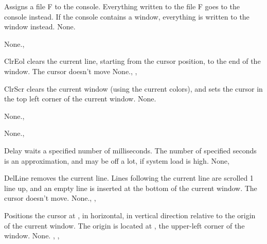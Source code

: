 {
Assigns a file F to the console. Everything written to the file F goes to
the console instead. If the console contains a window, everything is written
to the window instead.
}
{None.}{}

 \html{}

{None.}{, }

{ ClrEol clears the current line, starting from the cursor position, to the
end of the window. The cursor doesn't move}
{None.}{, , }

 \html{}

{ ClrScr clears the current window (using the current colors), 
and sets the cursor in the top left
corner of the current window.}
{None.}{  }

 \html{}

{None.}{, }

{None.}{, }

{Delay waits a specified number of milliseconds. The number of specified
seconds is an approximation, and may be off a lot, if system load is high.}
{None}{, }

 \html{}

{ DelLine removes the current line. Lines following the current line are 
scrolled 1 line up, and an empty line is inserted at the bottom of the
current window. The cursor doesn't move.}
{None.}{, , }

 \html{}

{ Positions the cursor at ,  in horizontal,  in
vertical direction relative to the origin of the current window. The origin
is located at , the upper-left corner of the window.
}
{None.}{ , ,  }

